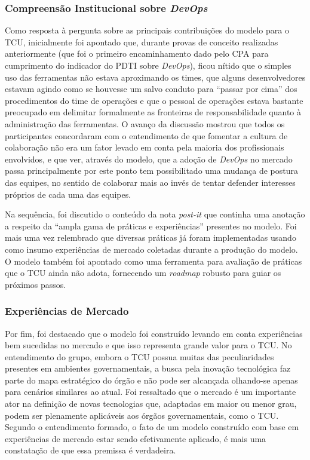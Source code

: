 \subsubsection{Compreensão Institucional sobre \emph{DevOps}}

Como resposta à pergunta sobre as principais contribuições do modelo para o
\acrshort{TCU}, inicialmente foi apontado que, durante provas
de conceito realizadas anteriormente (que foi o primeiro encaminhamento dado
pelo \acrshort{CPA} para cumprimento do indicador do \acrshort{PDTI} sobre {\it DevOps}), ficou
nítido que o simples uso das ferramentas não estava aproximando os times, que
alguns desenvolvedores estavam agindo como se houvesse um salvo conduto para
``passar por cima'' dos procedimentos do time de operações e que o pessoal de
operações estava bastante preocupado em delimitar formalmente as fronteiras de
responsabilidade quanto à administração das ferramentas. O avanço da discussão
mostrou que todos os participantes concordaram com o entendimento de que
fomentar a cultura de colaboração não era um fator levado em conta pela maioria
dos profissionais envolvidos, e que
ver, através do modelo, que a adoção de {\it DevOps} no mercado passa
principalmente por este ponto tem possibilitado uma mudança de postura das
equipes, no sentido de colaborar mais ao invés de tentar defender interesses
próprios de cada uma das equipes.

Na sequência, foi discutido o conteúdo da nota {\it post-it} que continha uma
anotação a respeito da ``ampla gama de práticas e experiências'' presentes no
modelo. Foi mais uma vez relembrado que diversas práticas já foram implementadas usando como insumo experiências
de mercado coletadas durante a produção do modelo. O modelo também foi apontado
como uma ferramenta para avaliação de práticas que o \acrshort{TCU} ainda não
adota, fornecendo um {\it roadmap} robusto para guiar os próximos passos.

\subsubsection{Experiências de Mercado}

Por fim, foi destacado que o modelo foi construído levando em conta
experiências bem sucedidas no mercado e que isso representa grande valor para
o \acrshort{TCU}. No entendimento do grupo, embora o \acrshort{TCU} possua
muitas das peculiaridades presentes em ambientes governamentais, a busca pela
inovação tecnológica faz parte do mapa estratégico do órgão e não pode ser
alcançada olhando-se apenas para cenários similares ao atual. Foi ressaltado
que o mercado é um importante ator na definição de novas tecnologias que,
adaptadas em maior ou menor grau, podem ser plenamente aplicáveis aos órgãos
governamentais, como o TCU. Segundo o entendimento formado, o fato de um modelo
construído com base em experiências de mercado estar sendo efetivamente
aplicado, é mais uma constatação de que essa premissa é verdadeira.

